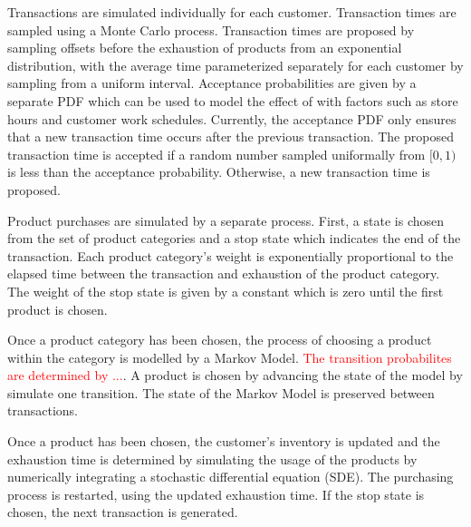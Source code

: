 \documentclass[conference]{IEEEtran}
\begin{document}
Transactions are simulated individually for each customer.  Transaction times are sampled using a Monte Carlo process.  Transaction times are proposed by sampling offsets before the exhaustion of products from an exponential distribution, with the average time parameterized separately for each customer by sampling from a uniform interval.  Acceptance probabilities are given by a separate PDF which can be used to model the effect of with factors such as store hours and customer work schedules.  Currently, the acceptance PDF only ensures that a new transaction time occurs after the previous transaction.  The proposed transaction time is accepted if a random number sampled uniformally from $[0, 1)$ is less than the acceptance probability. Otherwise, a new transaction time is proposed.

Product purchases are simulated by a separate process.  First, a state is chosen from the set of product categories and a stop state which indicates the end of the transaction.  Each product category's weight is exponentially proportional to the elapsed time between the transaction and exhaustion of the product category. The weight of the stop state is given by a constant which is zero until the first product is chosen.

Once a product category has been chosen, the process of choosing a product within the category is modelled by a Markov Model.  \textcolor{red}{The transition probabilites are determined by ...}. A product is chosen by advancing the state of the model by simulate one transition.  The state of the Markov Model is preserved between transactions.

Once a product has been chosen, the customer's inventory is updated and the exhaustion time is determined by simulating the usage of the products by numerically integrating a stochastic differential equation (SDE).  The purchasing process is restarted, using the updated exhaustion time.  If the stop state is chosen, the next transaction is generated.


\end{document}
